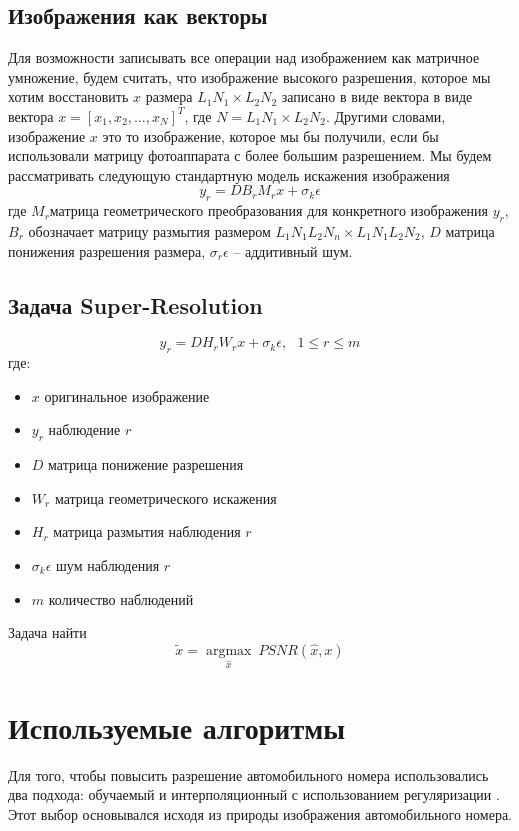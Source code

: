 \subsection{Изображения как векторы}
Для возможности записывать все операции над изображением как матричное умножение, будем считать, что изображение
высокого разрешения, которое мы хотим восстановить $x$ размера $L_{1}N_{1}\times L_{2}N_{2}$ записано в виде вектора в
виде вектора $x=[x_{1},x_{2},\dots,x_{N}]^{T}$, где $N=L_{1}{N_{1}\times L_{2}N_{2}}$. Другими словами, изображение $x$
это то изображение, которое мы бы получили, если бы использовали матрицу фотоаппарата с более большим разрешением. Мы
будем рассматривать следующую стандартную модель искажения изображения
$$ y_{r} = DB_rM_rx+\sigma_{k}\epsilon $$
где $M_{r}$матрица геометрического преобразования для конкретного изображения $y_{r}$, $ B_{r} $ обозначает матрицу размытия
размером $L_{1}N_{1}L_{2}N_{n}\times L_{1}N_{1}L_{2}N_{2}$, $D$ матрица понижения разрешения размера,
$\sigma_{r}\epsilon$ -- аддитивный шум.

\subsection{Задача Super-Resolution}
$$y_r = D H_r W_r x +\sigma_{k}\epsilon,~ ~ ~ 1 \leq r \leq m$$
 где:
 \begin{itemize}
   \item $x$ оригинальное изображение
   \item $y_r$ наблюдение $r$
   \item $D$ матрица понижение разрешения
   \item $W_r$ матрица геометрического искажения
   \item $H_r$ матрица размытия наблюдения $r$
   \item $\sigma_{k}\epsilon$ шум наблюдения $r$
   \item $m$ количество наблюдений
 \end{itemize}
 Задача найти
 $$ \tilde{x} = \underset{\hat{x}}{\operatorname{argmax}}~  PSNR(\hat{x},x)$$

\section{Используемые алгоритмы}
Для того, чтобы повысить разрешение автомобильного номера использовались два подхода: обучаемый \cite{yang2012coupled} и
интерполяционный с использованием регуляризации \cite{suresh2007superresolution}. Этот выбор основывался исходя из
природы изображения автомобильного номера.

